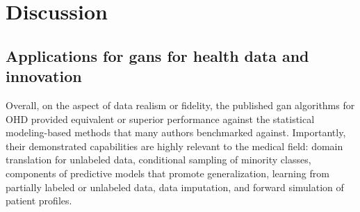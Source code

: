 \section{Discussion}
\subsection{Applications for \glspl{gan} for health data and innovation}

Overall, on the aspect of data realism or fidelity, the published \gls{gan} algorithms for OHD provided equivalent or superior performance against the statistical modeling-based methods that many authors benchmarked against. Importantly, their demonstrated capabilities are highly relevant to the medical field: domain translation for unlabeled data, conditional sampling of minority classes, components of predictive models that promote generalization, learning from partially labeled or unlabeled data, data imputation, and forward simulation of patient profiles.

